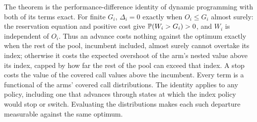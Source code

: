 The theorem is the performance-difference identity of dynamic programming with both of its terms
exact. For finite $G_i$, $\Delta_i=0$ exactly when $O_i\le G_i$ almost surely:
the reservation equation and positive cost give $\mathbb{P}(W_i>G_i)>0$, and $W_i$ is
independent of $O_i$. Thus an advance costs nothing against the optimum exactly
when the rest of the pool, incumbent included, almost surely cannot overtake its
index; otherwise it costs the expected
overshoot of the arm's nested value above its index, capped by how far the rest of the pool can
exceed that index. A stop costs the value of the covered call values above the incumbent. Every term is a functional of the arms' covered call distributions. The identity applies to any policy, including one that advances through states at which the index policy would stop or switch. Evaluating the distributions makes each such departure measurable against the same optimum.


